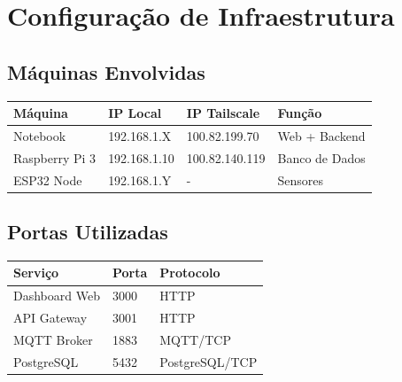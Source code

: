 \documentclass[12pt,a4paper,oneside]{report}
\begin{document}
\chapter{Configuração de Infraestrutura}

\section{Máquinas Envolvidas}

\begin{center}
\begin{tabular}{|l|l|l|l|}
    \hline
    \rowcolor{lightblue}
    \textbf{Máquina} & \textbf{IP Local} & \textbf{IP Tailscale} & \textbf{Função} \\
    \hline
    Notebook & 192.168.1.X & 100.82.199.70 & Web + Backend \\
    \hline
    Raspberry Pi 3 & 192.168.1.10 & 100.82.140.119 & Banco de Dados \\
    \hline
    ESP32 Node & 192.168.1.Y & - & Sensores \\
    \hline
\end{tabular}
\end{center}

\section{Portas Utilizadas}

\begin{center}
\begin{tabular}{|l|l|l|}
    \hline
    \rowcolor{lightblue}
    \textbf{Serviço} & \textbf{Porta} & \textbf{Protocolo} \\
    \hline
    Dashboard Web & 3000 & HTTP \\
    \hline
    API Gateway & 3001 & HTTP \\
    \hline
    MQTT Broker & 1883 & MQTT/TCP \\
    \hline
    PostgreSQL & 5432 & PostgreSQL/TCP \\
    \hline
\end{tabular}
\end{center}
\end{document}

